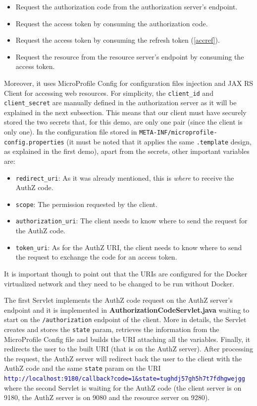 \begin{itemize}
    \item Request the authorization code from the authorization server's endpoint.
    \item Request the access token by consuming the authorization code.
    \item Request the access token by consuming the refresh token (\ref{accref}).
    \item Request the resource from the resource server's endpoint by consuming the access token.
\end{itemize}

\noindent Moreover, it uses MicroProfile Config for configuration files injection and JAX RS Client for accessing web resources. For simplicity, the \texttt{client\_id} and \texttt{client\_secret} are manually defined in the authorization server as it will be explained in the next subsection. This means that our client must have securely stored the two secrets that, for this demo, are only one pair (since the client is only one). In the configuration file stored in \texttt{META-INF/microprofile-config.properties} (it must be noted that it applies the same \texttt{.template} design, as explained in the first demo), apart from the secrets, other important variables are:

\begin{itemize}
    \item \texttt{redirect\_uri}: As it was already mentioned, this is \textit{where} to receive the AuthZ code.
    \item \texttt{scope}: The permission requested by the client.
    \item \texttt{authorization\_uri}: The client needs to know where to send the request for the AuthZ code.
    \item \texttt{token\_uri}: As for the AuthZ URI, the client needs to know where to send the request to exchange the code for an access token.
\end{itemize}

\noindent It is important though to point out that the URIs are configured for the Docker virtualized network and they need to be changed to be run without Docker.

The first Servlet implements the AuthZ code request on the AuthZ server's endpoint and it is implemented in \textbf{AuthorizationCodeServlet.java} waiting to start on the \texttt{/authorization} endpoint of the client. More in details, the Servlet creates and stores the \texttt{state} param, retrieves the information from the MicroProfile Config file and builds the URI attaching all the variables. Finally, it redirects the user to the built URI (that is on the AuthZ server). After processing the request, the AuthZ server will redirect back the user to the client with the AuthZ code and the same \texttt{state} param on the URI \textcolor{blue}{\texttt{http://localhost:9180/callback?code=1\&state=tughdj57gh5h7t7fdhgwejgg}} where the second Servlet is waiting for the AuthZ code (the client server is on 9180, the AuthZ server is on 9080 and the resource server on 9280).

